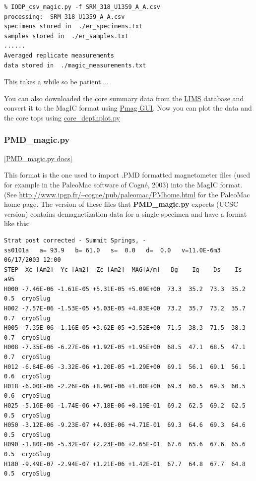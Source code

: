 \documentclass[11pt]{book}
\begin{document}
{{\begin{verbatim}
% IODP_csv_magic.py -f SRM_318_U1359_A_A.csv
processing:  SRM_318_U1359_A_A.csv
specimens stored in  ./er_specimens.txt
samples stored in  ./er_samples.txt
......
Averaged replicate measurements
data stored in  ./magic_measurements.txt
\end{verbatim}

This takes a while so be patient....

You can also downloaded the {core summary} data from the \href{#LIMS} {LIMS} database and convert it to the MagIC format using \href{#pmag_gui.py}{Pmag GUI}.
Now you can plot the data and the core tops using \href{#core_depthplot.py}{core\_depthplot.py}



\subsubsection{PMD\_magic.py}
\href{https://github.com/PmagPy/PmagPy/blob/master/programs/PMD_magic.py}{[PMD\_magic.py docs]}

This format is the one used to import  .PMD formatted magnetometer files (used for example in the PaleoMac software of Cogn\'e, 2003) \nocite{cogne03} into the MagIC format.  (See \url{http://www.ipgp.fr/~cogne/pub/paleomac/PMhome.html} for the PaleoMac home page.
The version of these files that {\bf PMD\_magic.py} expects (UCSC version) contains demagnetization data for a single specimen and have a format like this:

\begin{verbatim}
Strat post corrected - Summit Springs, -
ss0101a   a= 93.9   b= 61.0   s=  0.0   d=  0.0   v=11.0E-6m3  06/17/2003 12:00
STEP  Xc [Am2]  Yc [Am2]  Zc [Am2]  MAG[A/m]   Dg    Ig    Ds    Is  a95
H000 -7.46E-06 -1.61E-05 +5.31E-05 +5.09E+00  73.3  35.2  73.3  35.2  0.5  cryoSlug
H002 -7.57E-06 -1.53E-05 +5.03E-05 +4.83E+00  73.2  35.7  73.2  35.7  0.7  cryoSlug
H005 -7.35E-06 -1.16E-05 +3.62E-05 +3.52E+00  71.5  38.3  71.5  38.3  0.7  cryoSlug
H008 -7.35E-06 -6.27E-06 +1.92E-05 +1.95E+00  68.5  47.1  68.5  47.1  0.7  cryoSlug
H012 -6.84E-06 -3.32E-06 +1.20E-05 +1.29E+00  69.1  56.1  69.1  56.1  0.6  cryoSlug
H018 -6.00E-06 -2.26E-06 +8.96E-06 +1.00E+00  69.3  60.5  69.3  60.5  0.6  cryoSlug
H025 -5.16E-06 -1.74E-06 +7.18E-06 +8.19E-01  69.2  62.5  69.2  62.5  0.5  cryoSlug
H050 -3.12E-06 -9.23E-07 +4.03E-06 +4.71E-01  69.3  64.6  69.3  64.6  0.5  cryoSlug
H090 -1.80E-06 -5.32E-07 +2.23E-06 +2.65E-01  67.6  65.6  67.6  65.6  0.5  cryoSlug
H180 -9.49E-07 -2.94E-07 +1.21E-06 +1.42E-01  67.7  64.8  67.7  64.8  0.5  cryoSlug
\end{verbatim}

}}
\end{document}
